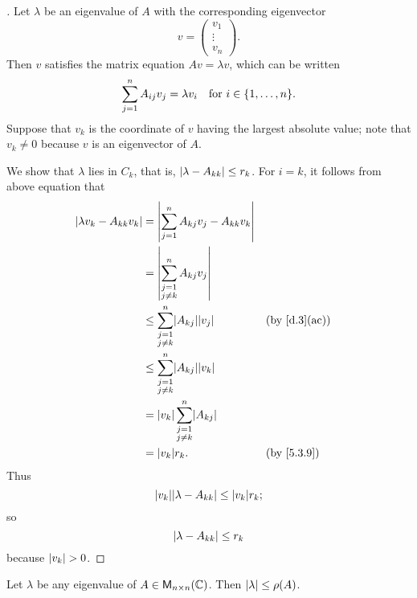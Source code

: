 \begin{proof}[]
	Let \(\lambda\) be an eigenvalue of \(A\) with the corresponding eigenvector
	\[
		v = \begin{pmatrix}
			v_1    \\
			\vdots \\
			v_n
		\end{pmatrix}.
	\]
	Then \(v\) satisfies the matrix equation \(Av = \lambda v\), which can be written
	\[
		\sum_{j = 1}^n A_{i j} v_j = \lambda v_i \quad \text{for } i \in \set{1, \dots, n}.
	\]
	Suppose that \(v_k\) is the coordinate of \(v\) having the largest absolute value;
	note that \(v_k \neq 0\) because \(v\) is an eigenvector of \(A\).

	We show that \(\lambda\) lies in \(C_k\), that is, \(\left\lvert\lambda - A_{k k}\right\rvert \leq r_k\).
	For \(i = k\), it follows from above equation that
	\begin{align*}
		\abs{\lambda v_k - A_{k k} v_k} & = \abs{\sum_{j = 1}^n A_{k j} v_j - A_{k k} v_k}                 \\
		                                & = \abs{\sum_{\substack{j = 1                                     \\ j \neq k}}^n A_{k j} v_j}              \\
		                                & \leq \sum_{\substack{j = 1                                       \\ j \neq k}}^n \abs{A_{k j}} \abs{v_j}    && \by{d.3}[ac] \\
		                                & \leq \sum_{\substack{j = 1                                       \\ j \neq k}}^n \abs{A_{k j}} \abs{v_k}     \\
		                                & = \abs{v_k} \sum_{\substack{j = 1                                \\ j \neq k}}^n \abs{A_{k j}}        \\
		                                & = \abs{v_k} r_k.                                 &  & \by{5.3.9}
	\end{align*}
	Thus
	\[
		\abs{v_k} \abs{\lambda - A_{k k}} \leq \abs{v_k} r_k;
	\]
	so
	\[
		\left\lvert\lambda - A_{k k}\right\rvert \leq r_k
	\]
	because \(\left\lvert v_k\right\rvert > 0\).
\end{proof}

\begin{cor}\label{5.3.10}
	Let \(\lambda\) be any eigenvalue of \(A \in \ms[n][n][\C]\).
	Then \(\left\lvert\lambda\right\rvert \leq \rho(A)\).
\end{cor}

